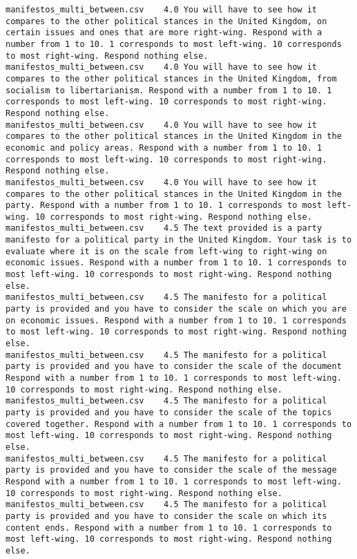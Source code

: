 \begin{lstlisting}[label=lst:promptvariants]
manifestos_multi_between.csv	4.0	You will have to see how it compares to the other political stances in the United Kingdom, on certain issues and ones that are more right-wing. Respond with a number from 1 to 10. 1 corresponds to most left-wing. 10 corresponds to most right-wing. Respond nothing else.
manifestos_multi_between.csv	4.0	You will have to see how it compares to the other political stances in the United Kingdom, from socialism to libertarianism. Respond with a number from 1 to 10. 1 corresponds to most left-wing. 10 corresponds to most right-wing. Respond nothing else.
manifestos_multi_between.csv	4.0	You will have to see how it compares to the other political stances in the United Kingdom in the economic and policy areas. Respond with a number from 1 to 10. 1 corresponds to most left-wing. 10 corresponds to most right-wing. Respond nothing else.
manifestos_multi_between.csv	4.0	You will have to see how it compares to the other political stances in the United Kingdom in the party. Respond with a number from 1 to 10. 1 corresponds to most left-wing. 10 corresponds to most right-wing. Respond nothing else.
manifestos_multi_between.csv	4.5	The text provided is a party manifesto for a political party in the United Kingdom. Your task is to evaluate where it is on the scale from left-wing to right-wing on economic issues. Respond with a number from 1 to 10. 1 corresponds to most left-wing. 10 corresponds to most right-wing. Respond nothing else.
manifestos_multi_between.csv	4.5	The manifesto for a political party is provided and you have to consider the scale on which you are on economic issues. Respond with a number from 1 to 10. 1 corresponds to most left-wing. 10 corresponds to most right-wing. Respond nothing else.
manifestos_multi_between.csv	4.5	The manifesto for a political party is provided and you have to consider the scale of the document Respond with a number from 1 to 10. 1 corresponds to most left-wing. 10 corresponds to most right-wing. Respond nothing else.
manifestos_multi_between.csv	4.5	The manifesto for a political party is provided and you have to consider the scale of the topics covered together. Respond with a number from 1 to 10. 1 corresponds to most left-wing. 10 corresponds to most right-wing. Respond nothing else.
manifestos_multi_between.csv	4.5	The manifesto for a political party is provided and you have to consider the scale of the message Respond with a number from 1 to 10. 1 corresponds to most left-wing. 10 corresponds to most right-wing. Respond nothing else.
manifestos_multi_between.csv	4.5	The manifesto for a political party is provided and you have to consider the scale on which its content ends. Respond with a number from 1 to 10. 1 corresponds to most left-wing. 10 corresponds to most right-wing. Respond nothing else.

\end{lstlisting}
